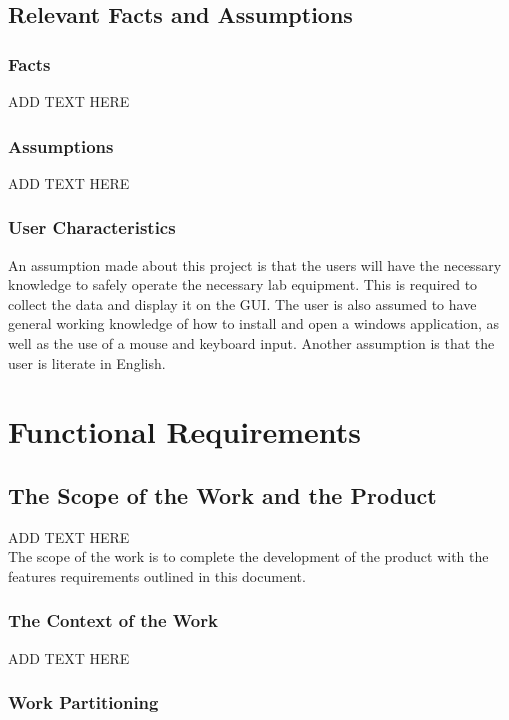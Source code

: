 \documentclass[12pt, titlepage]{article}
\begin{document}
\subsection{Relevant Facts and Assumptions}
\subsubsection{Facts}
ADD TEXT HERE

\subsubsection{Assumptions}
ADD TEXT HERE

\subsubsection{User Characteristics}
An assumption made about this project is that the users will have the necessary knowledge to safely operate the necessary lab equipment. This is required to collect the data and display it on the GUI. 
The user is also assumed to have general working knowledge of how to install and open a windows application, as well as the use of a mouse and keyboard input. Another assumption is that the user is literate in English.

\section{Functional Requirements}
\subsection{The Scope of the Work and the Product}

ADD TEXT HERE \\
The scope of the work is to complete the development of the product with the features requirements outlined in this document. 

\subsubsection{The Context of the Work}
ADD TEXT HERE

\subsubsection{Work Partitioning}
\end{document}
